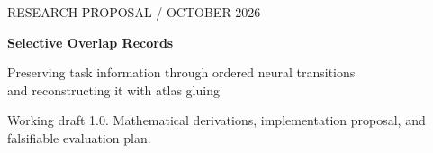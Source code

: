 \documentclass[11pt,letterpaper]{article}
\theoremstyle{definition}
\theoremstyle{remark}
\begin{document}
\thispagestyle{plain}
{\color{teal}\small RESEARCH PROPOSAL \quad /  OCTOBER 2026}
\vspace{8pt}

{\LARGE\bfseries\color{ink}Selective Overlap Records\par}
\vspace{4pt}
{\large Preserving task information through ordered neural transitions\\
and reconstructing it with atlas gluing\par}
\vspace{10pt}
{\small Working draft 1.0. Mathematical derivations, implementation proposal,
and falsifiable evaluation plan.}




\clearpage
\appendix


\clearpage
{}
{}

\end{document}
